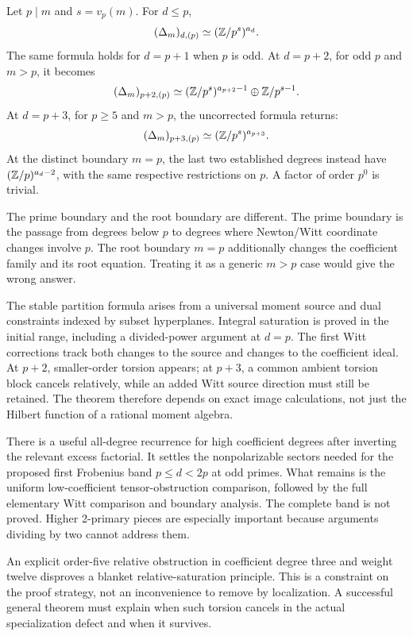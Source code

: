 \begin{theorem}
Let $p\mid m$ and $s=v_p(m)$. For $d\le p$,
\[
 (\Delta_m)_{d,(p)}\simeq(\mathbb Z/p^s)^{a_d}.
\]
The same formula holds for $d=p+1$ when $p$ is odd. At $d=p+2$, for odd $p$ and $m>p$, it becomes
\[
 (\Delta_m)_{p+2,(p)}\simeq
 (\mathbb Z/p^s)^{a_{p+2}-1}\oplus\mathbb Z/p^{s-1}.
\]
At $d=p+3$, for $p\ge5$ and $m>p$, the uncorrected formula returns:
\[
 (\Delta_m)_{p+3,(p)}\simeq(\mathbb Z/p^s)^{a_{p+3}}.
\]
At the distinct boundary $m=p$, the last two established degrees instead have $(\mathbb Z/p)^{a_d-2}$, with the same respective restrictions on $p$. A factor of order $p^0$ is trivial.
\end{theorem}
The prime boundary and the root boundary are different. The prime boundary is the passage from degrees below $p$ to degrees where Newton/Witt coordinate changes involve $p$. The root boundary $m=p$ additionally changes the coefficient family and its root equation. Treating it as a generic $m>p$ case would give the wrong answer.

The stable partition formula arises from a universal moment source and dual constraints indexed by subset hyperplanes. Integral saturation is proved in the initial range, including a divided-power argument at $d=p$. The first Witt corrections track both changes to the source and changes to the coefficient ideal. At $p+2$, smaller-order torsion appears; at $p+3$, a common ambient torsion block cancels relatively, while an added Witt source direction must still be retained. The theorem therefore depends on exact image calculations, not just the Hilbert function of a rational moment algebra.

There is a useful all-degree recurrence for high coefficient degrees after inverting the relevant excess factorial. It settles the nonpolarizable sectors needed for the proposed first Frobenius band $p\le d<2p$ at odd primes. What remains is the uniform low-coefficient tensor-obstruction comparison, followed by the full elementary Witt comparison and boundary analysis. The complete band is not proved. Higher 2-primary pieces are especially important because arguments dividing by two cannot address them.

An explicit order-five relative obstruction in coefficient degree three and weight twelve disproves a blanket relative-saturation principle. This is a constraint on the proof strategy, not an inconvenience to remove by localization. A successful general theorem must explain when such torsion cancels in the actual specialization defect and when it survives.

